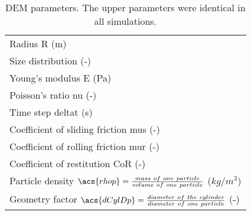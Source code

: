 \begin{table}[h]
\centering
\begin{tabular}{l}
\toprule
    Radius \acs{R} (m)   \\ [5pt]

	Size distribution (-) \\ [5pt]

    Young's modulus \acs{E} (Pa)  \\ [5pt]

    Poisson's ratio \acs{nu} (-) \\ 
     Time step \acs{deltat} (s) \\ [5pt]
\midrule
     Coefficient of sliding friction \acs{mus} (-)\\  [5pt]
    Coefficient of rolling friction \acs{mur} (-) \\ [5pt]
    Coefficient of restitution \acs{CoR} (-)   \\ [5pt]
     Particle density $\acs{rhop} = \frac{mass ~ of ~ one ~ particle}{volume ~ of
     ~ one ~ particle}$ ($kg/m^3$)  \\ [5pt]
     Geometry factor $\acs{dCylDp} = \frac{diameter ~ of ~ the ~
     cylinder}{diameter ~ of ~ one ~ particle}$ (-)  \\ [5pt]
   
\bottomrule
\end{tabular}
\caption[DEM parameters]{DEM parameters. The upper parameters were
identical in all simulations.
}
\label{tab:08DEMparameters}
\end{table}


